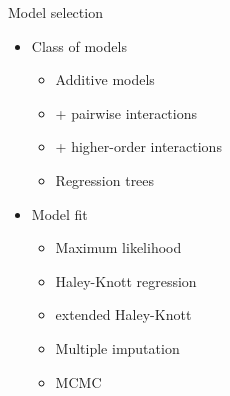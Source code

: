 \documentclass[12pt]{article}
\newcommand{\headsize}{\fontsize{35}{35} \selectfont}
\newcommand{\smallersize}{\fontsize{20}{25} \selectfont}
\newcommand{\smallestsize}{\fontsize{18}{22} \selectfont}
\begin{document}
\newpage

\headsize \color{myyellow}
\hfill \begin{minipage}{5.75in}
\centering
Model selection
\end{minipage}

\vspace{15mm} \color{mywhite} \smallersize

\hspace{0.5in}
\begin{minipage}[t]{4in}
\vspace*{0mm}

\begin{itemize}
\item Class of models
{\smallestsize \color{myblue} \begin{itemize}
\item Additive models
\item + pairwise interactions
\item + higher-order interactions
\item Regression trees
\end{itemize} }

\vspace{15mm}

\item Model fit
{\smallestsize \color{myblue} \begin{itemize}
\item Maximum likelihood
\item Haley-Knott regression
\item extended Haley-Knott
\item Multiple imputation
\item MCMC
\end{itemize} }

\end{itemize}

\end{minipage} \hspace{1in}
\end{document}
